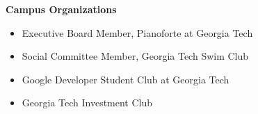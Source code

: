 \documentclass[letterpaper,11pt]{article}
\makeatletter
\newcommand{\resitem}[1]{\item #1 \vspace{-2pt}}
\newcommand{\resheading}[1]{{\large \colorbox{mygrey}{\begin{minipage}{\textwidth}{\textbf{#1 \vphantom{p\^{E}}}}\end{minipage}}}}
\newcommand{\ressubheading}[4]{
\begin{tabular*}{7.0in}{l@{\extracolsep{\fill}}r}
		\textbf{#1} & #2 \\
		\textit{#3} & \textit{#4} \\
\end{tabular*}\vspace{-6pt}}
\makeatother
\begin{document}
\resheading{Campus Organizations}
\begin{itemize}
\resitem{Executive Board Member, Pianoforte at Georgia Tech}
\resitem{Social Committee Member, Georgia Tech Swim Club}
\resitem{Google Developer Student Club at Georgia Tech}
\resitem{Georgia Tech Investment Club}
\end{itemize}

\end{document}
